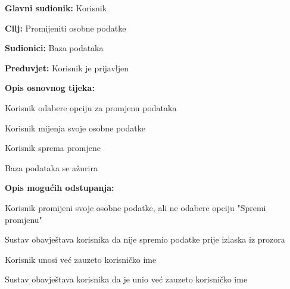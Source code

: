 					
						\noindent {}
					\begin{packed_item}
	
						\item \textbf{Glavni sudionik: }Korisnik
						\item  \textbf{Cilj:} Promijeniti osobne podatke
						\item  \textbf{Sudionici:} Baza podataka
						\item  \textbf{Preduvjet:} Korisnik je prijavljen
						\item  \textbf{Opis osnovnog tijeka:}
						
						\item[] \begin{packed_enum}
	
							\item Korisnik odabere opciju za promjenu podataka
							\item Korisnik mijenja svoje osobne podatke
							\item Korisnik sprema promjene
							\item Baza podataka se ažurira

						\end{packed_enum}
						
						\item  \textbf{Opis mogućih odstupanja:}
						
						\item[] \begin{packed_item}
	
							\item[2.a] Korisnik promijeni svoje osobne podatke, ali ne odabere opciju "Spremi promjenu"
							\item[] \begin{packed_enum}
								
								\item Sustav obavještava korisnika da nije spremio podatke prije izlaska iz prozora
								
							\end{packed_enum}
							\item[2.b] Korisnik unosi već zauzeto korisničko ime
                            \item[] \begin{packed_enum}
								
								\item Sustav obavještava korisnika da je unio već zauzeto korisničko ime
								
							\end{packed_enum}
							
						\end{packed_item}
					\end{packed_item}
					
